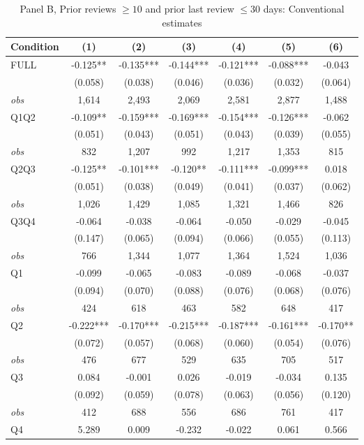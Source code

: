\begin{table}[!htbp]
\centering
\caption{Panel B, Prior reviews $\geq 10$ and prior last review $\leq 30$ days: Conventional estimates}
\label{tab:trim00:b:reviews_ge10_and_prior_last_review_le30d}
\small
\begin{tabular}{lcccccc}
\toprule
Condition & (1) & (2) & (3) & (4) & (5) & (6) \\
\midrule
FULL & -0.125** & -0.135*** & -0.144*** & -0.121*** & -0.088*** & -0.043 \\
 & (0.058) & (0.038) & (0.046) & (0.036) & (0.032) & (0.064) \\
\textit{obs} & 1,614 & 2,493 & 2,069 & 2,581 & 2,877 & 1,488 \\
Q1Q2 & -0.109** & -0.159*** & -0.169*** & -0.154*** & -0.126*** & -0.062 \\
 & (0.051) & (0.043) & (0.051) & (0.043) & (0.039) & (0.055) \\
\textit{obs} &   832 & 1,207 &   992 & 1,217 & 1,353 &   815 \\
Q2Q3 & -0.125** & -0.101*** & -0.120** & -0.111*** & -0.099*** & 0.018 \\
 & (0.051) & (0.038) & (0.049) & (0.041) & (0.037) & (0.062) \\
\textit{obs} & 1,026 & 1,429 & 1,085 & 1,321 & 1,466 &   826 \\
Q3Q4 & -0.064 & -0.038 & -0.064 & -0.050 & -0.029 & -0.045 \\
 & (0.147) & (0.065) & (0.094) & (0.066) & (0.055) & (0.113) \\
\textit{obs} &   766 & 1,344 & 1,077 & 1,364 & 1,524 & 1,036 \\
Q1 & -0.099 & -0.065 & -0.083 & -0.089 & -0.068 & -0.037 \\
 & (0.094) & (0.070) & (0.088) & (0.076) & (0.068) & (0.076) \\
\textit{obs} & 424 & 618 & 463 & 582 & 648 & 417 \\
Q2 & -0.222*** & -0.170*** & -0.215*** & -0.187*** & -0.161*** & -0.170** \\
 & (0.072) & (0.057) & (0.068) & (0.060) & (0.054) & (0.076) \\
\textit{obs} & 476 & 677 & 529 & 635 & 705 & 517 \\
Q3 & 0.084 & -0.001 & 0.026 & -0.019 & -0.034 & 0.135 \\
 & (0.092) & (0.059) & (0.078) & (0.063) & (0.056) & (0.120) \\
\textit{obs} & 412 & 688 & 556 & 686 & 761 & 417 \\
Q4 & 5.289 & 0.009 & -0.232 & -0.022 & 0.061 & 0.566 \\

\end{tabular}
\end{table}
